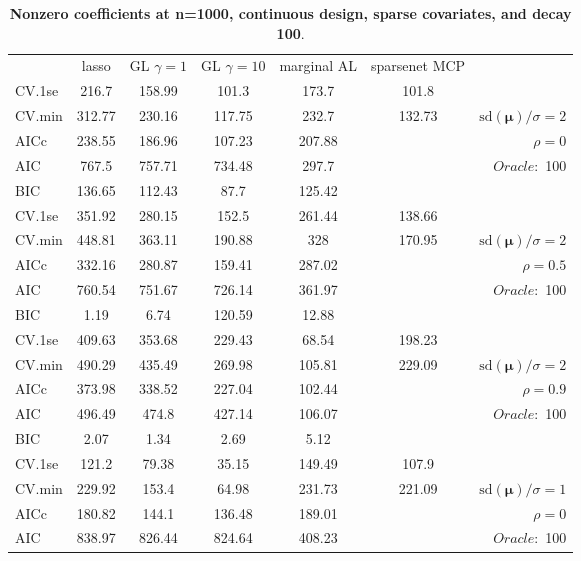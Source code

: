 \begin{table}\vspace{-.5cm}
\caption[l]{ { \bf Nonzero coefficients at n=1000, continuous design, 
sparse covariates, and  decay  100}.}
\vspace{-.5cm}
\footnotesize{}
\begin{center}
\begin{tabular}{l*{5}{c}|r}
& lasso & GL $\gamma=1$ & GL $\gamma=10$ & marginal AL & sparsenet MCP  & \\
 \cline{1-7}
CV.1se & 216.7 & 158.99 & 101.3 & 173.7 & 101.8 & \\
CV.min & 312.77 & 230.16 & 117.75 & 232.7 & 132.73 &  $\mathrm{sd}(\mathbf{\mu})/\sigma=2$ \\
AICc & 238.55 & 186.96 & 107.23 & 207.88 & & $\rho=0$ \\
AIC & 767.5 & 757.71 & 734.48 & 297.7 & &  \multirow{2}{*}{$Oracle: $ 100} \\
BIC & 136.65 & 112.43 & 87.7 & 125.42 & &  \\
 \hline 
CV.1se & 351.92 & 280.15 & 152.5 & 261.44 & 138.66 & \\
CV.min & 448.81 & 363.11 & 190.88 & 328 & 170.95 &  $\mathrm{sd}(\mathbf{\mu})/\sigma=2$ \\
AICc & 332.16 & 280.87 & 159.41 & 287.02 & & $\rho=0.5$ \\
AIC & 760.54 & 751.67 & 726.14 & 361.97 & &  \multirow{2}{*}{$Oracle: $ 100} \\
BIC & 1.19 & 6.74 & 120.59 & 12.88 & &  \\
 \hline 
CV.1se & 409.63 & 353.68 & 229.43 & 68.54 & 198.23 & \\
CV.min & 490.29 & 435.49 & 269.98 & 105.81 & 229.09 &  $\mathrm{sd}(\mathbf{\mu})/\sigma=2$ \\
AICc & 373.98 & 338.52 & 227.04 & 102.44 & & $\rho=0.9$ \\
AIC & 496.49 & 474.8 & 427.14 & 106.07 & &  \multirow{2}{*}{$Oracle: $ 100} \\
BIC & 2.07 & 1.34 & 2.69 & 5.12 & &  \\
 \hline 
CV.1se & 121.2 & 79.38 & 35.15 & 149.49 & 107.9 & \\
CV.min & 229.92 & 153.4 & 64.98 & 231.73 & 221.09 &  $\mathrm{sd}(\mathbf{\mu})/\sigma=1$ \\
AICc & 180.82 & 144.1 & 136.48 & 189.01 & & $\rho=0$ \\
AIC & 838.97 & 826.44 & 824.64 & 408.23 & &  \multirow{2}{*}{$Oracle: $ 100} \\

\end{tabular}
\end{center}
\end{table}
